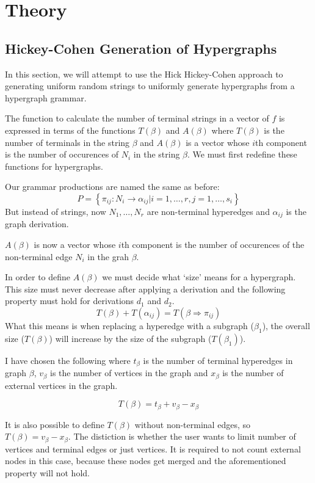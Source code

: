 \section{Theory}

\subsection{Hickey-Cohen Generation of Hypergraphs}

  In this section, we will attempt to use the Hick Hickey-Cohen approach to generating uniform random strings to uniformly generate hypergraphs from a hypergraph grammar. 

  The function to calculate the number of terminal strings in a vector of  $f$ is expressed in terms of the functions $T(\beta)$ and $A(\beta)$ where $T(\beta)$ is the number of terminals in the string $\beta$ and $A(\beta)$ is a vector whose $i$th component is the number of occurences of $N_i$ in the string $\beta$. We must first redefine these functions for hypergraphs.

  Our grammar productions are named the same as before:
  \[P = \left\{\pi_{ij} : N_i \to \alpha_{ij} | i = 1,\dots,r, j = 1, \dots,s_i \right\}\]
  But instead of strings, now $N_1,\dots,N_r$ are non-terminal hyperedges and $\alpha_{ij}$ is the graph derivation.

  $A(\beta)$ is now a vector whose $i$th component is the number of occurences of the non-terminal edge $N_i$ in the grah $\beta$.

  In order to define $A(\beta)$ we must decide what `size' means for a hypergraph. This size must never decrease after applying a derivation and the following property must hold for derivations $d_1$ and $d_2$.
  \[
  T(\beta) + T(\alpha_{ij}) = T(\beta \Rightarrow \pi_{ij})
  \]
  What this means is when replacing a hyperedge with a subgraph ($\beta_1$), the overall size ($T(\beta)$) will increase by the size of the subgraph ($T(\beta_1)$).

  I have chosen the following where $t_\beta$ is the number of terminal hyperedges in graph $\beta$, $v_\beta$ is the number of vertices in the graph and $x_\beta$ is the number of external vertices in the graph.

  \[T(\beta) = t_\beta + v_\beta - x_\beta\]

  It is also possible to define $T(\beta)$ without non-terminal edges, so $T(\beta) = v_\beta - x_\beta$. The distiction is whether the user wants to limit number of vertices and terminal edges or just vertices. It is required to not count external nodes in this case, because these nodes get merged and the aforementioned property will not hold.

